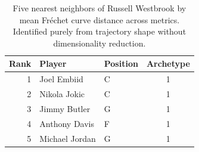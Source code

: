 \begin{table}[htbp]
  \centering\small
  \begin{tabular}{rllc}
    \toprule
    Rank & Player & Position & Archetype \\
    \midrule
    1 & Joel Embiid & C & 1 \\
    2 & Nikola Jokic & C & 1 \\
    3 & Jimmy Butler & G & 1 \\
    4 & Anthony Davis & F & 1 \\
    5 & Michael Jordan & G & 1 \\
    \bottomrule
  \end{tabular}
  \caption{Five nearest neighbors of Russell Westbrook by mean Fr\'{e}chet curve distance across metrics. Identified purely from trajectory shape without dimensionality reduction.}
  \label{tab:Russell_Westbrook_frechet_curve_neighbors}
\end{table}

